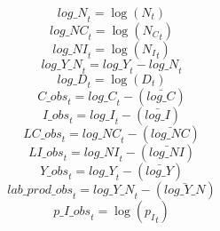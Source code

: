 \begin{dmath}
{log\_N}_{t}=\log\left({{N}}_{t}\right)
\end{dmath}
\begin{dmath}
{log\_NC}_{t}=\log\left({{N_C}}_{t}\right)
\end{dmath}
\begin{dmath}
{log\_NI}_{t}=\log\left({{N_I}}_{t}\right)
\end{dmath}
\begin{dmath}
{log\_Y\_N}_{t}={log\_Y}_{t}-{log\_N}_{t}
\end{dmath}
\begin{dmath}
{log\_D}_{t}=\log\left({{D}}_{t}\right)
\end{dmath}
\begin{dmath}
{C\_obs}_{t}={log\_C}_{t}-(\bar{log\_C})
\end{dmath}
\begin{dmath}
{I\_obs}_{t}={log\_I}_{t}-(\bar{log\_I})
\end{dmath}
\begin{dmath}
{LC\_obs}_{t}={log\_NC}_{t}-(\bar{log\_NC})
\end{dmath}
\begin{dmath}
{LI\_obs}_{t}={log\_NI}_{t}-(\bar{log\_NI})
\end{dmath}
\begin{dmath}
{Y\_obs}_{t}={log\_Y}_{t}-(\bar{log\_Y})
\end{dmath}
\begin{dmath}
{lab\_prod\_obs}_{t}={log\_Y\_N}_{t}-(\bar{log\_Y\_N})
\end{dmath}
\begin{dmath}
{p\_I\_obs}_{t}=\log\left({{p_I}}_{t}\right)
\end{dmath}
